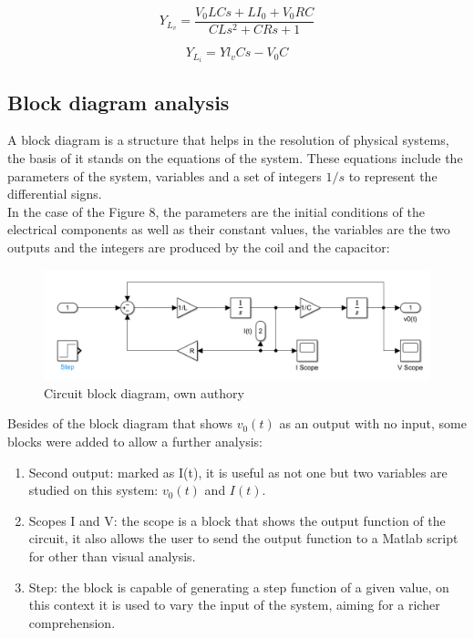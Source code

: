 \documentclass[a4paper,12pt]{article}
\begin{document}
\begin{equation}
    Y_{L_v} = \frac{V_0LCs + LI_0 + V_0RC}{CLs^2 + CRs + 1}
\end{equation}

\vspace{0.5cm}

\begin{equation}
    Y_{L_i} = Yl_vCs - V_0C
\end{equation}

\vspace{0.5cm}

\subsection{Block diagram analysis}

\vspace{0.5cm}

A block diagram is a structure that helps in the resolution of physical systems, the basis of it stands on the equations of the system. These equations include the parameters of the system, variables and a set of integers $1/s$ to represent the differential signs.\\ In the case of the Figure 8, the parameters are the initial conditions of the electrical components as well as their constant values, the variables are the two outputs and the integers are produced by the coil and the capacitor:

\vspace{0.5cm}

\begin{figure}[H]
    \centering
    \includegraphics[width=0.75\linewidth]{block diagram.png}
    \caption{Circuit block diagram, own authory}
    \label{fig:Lab 2 circuit}
\end{figure}

\vspace{0.5cm}

Besides of the block diagram that shows $v_0(t)$ as an output with no input, some blocks were added to allow a further analysis:

\begin{enumerate}
    \item Second output: marked as I(t), it is useful as not one but two variables are studied on this system: $v_0(t)$ and $I(t)$.

    \item Scopes I and V: the scope is a block that shows the output function of the circuit, it also allows the user to send the output function to a Matlab script for other than visual analysis.

    \item Step: the block is capable of generating a step function of a given value, on this context it is used to vary the input of the system, aiming for a richer comprehension.
\end{enumerate}
\end{document}

